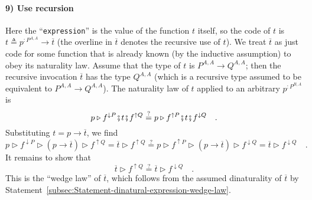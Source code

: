 \begin{comment}
g\triangleright f^{\uparrow K}\\
h\triangleright f^{\uparrow L}
\end{array}\,\bef f^{\downarrow Q}\\
{\color{greenunder}\text{composition}:}\quad & =e\triangleright\,\begin{array}{||c|}
f^{\uparrow R}\bef f^{\downarrow R}\bef g\bef f^{\uparrow Q}\\
f^{\uparrow S}\bef f^{\downarrow S}\bef h\bef f^{\uparrow Q}
\end{array}\,\bef f^{\downarrow Q}=e\triangleright\,\begin{array}{||c|}
f^{\uparrow R}\bef f^{\downarrow R}\bef g\bef f^{\uparrow Q}\bef f^{\downarrow Q}\\
f^{\uparrow S}\bef f^{\downarrow S}\bef h\bef f^{\uparrow Q}\bef f^{\downarrow Q}
\end{array}\quad.
\end{align*}
The two sides of the naturality law now differ only by the application
order of lifted functions $f$. Applying the profunctor commutativity
law of $R$, $S$, and $Q$, we find that the two sides of the naturality
law are equal.
\end{comment}


\paragraph{9) Use recursion}

Here the \textsf{``}\lstinline!expression!\textsf{''} is the value of the function
$t$ itself, so the code of $t$ is $t\triangleq p^{:P^{A,A}}\rightarrow\overline{t}$
(the overline in $\overline{t}$ denotes the recursive use of $t$).
We treat $\overline{t}$ as just code for some function that is already
known (by the inductive assumption) to obey its naturality law. Assume
that the type of $t$ is $P^{A,A}\rightarrow Q^{A,A}$; then the recursive
invocation $\overline{t}$ has the type $Q^{A,A}$ (which is a recursive
type assumed to be equivalent to $P^{A,A}\rightarrow Q^{A,A}$). The
naturality law of $t$ applied to an arbitrary $p^{:P^{B,A}}$ is
\[
p\triangleright f^{\downarrow P}\bef t\bef f^{\uparrow Q}\overset{?}{=}p\triangleright f^{\uparrow P}\bef t\bef f^{\downarrow Q}\quad.
\]
Substituting $t=p\rightarrow\overline{t}$, we find
\[
p\triangleright f^{\downarrow P}\triangleright(p\rightarrow\overline{t})\triangleright f^{\uparrow Q}=\overline{t}\triangleright f^{\uparrow Q}\overset{?}{=}p\triangleright f^{\uparrow P}\triangleright(p\rightarrow\overline{t})\triangleright f^{\downarrow Q}=\overline{t}\triangleright f^{\downarrow Q}\quad.
\]
It remains to show that 
\[
\overline{t}\triangleright f^{\uparrow Q}\overset{?}{=}\overline{t}\triangleright f^{\downarrow Q}\quad.
\]
This is the \textsf{``}wedge law\textsf{''} of $\overline{t}$, which follows from
the assumed dinaturality of $\overline{t}$ by Statement~\ref{subsec:Statement-dinatural-expression-wedge-law}.

